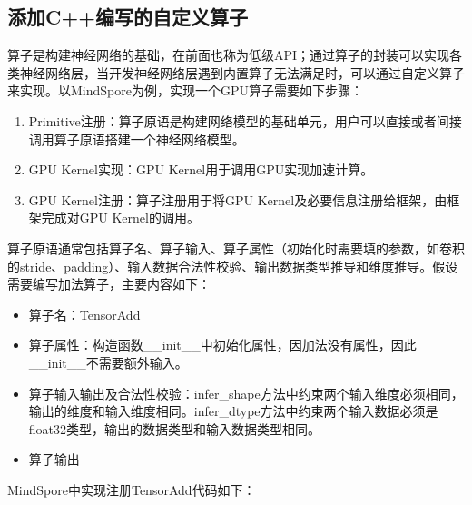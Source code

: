 \documentclass[letterpaper,10pt,english]{sphinxmanual}
\begin{document}
\subsection{添加C++编写的自定义算子}
\label{\detokenize{chapter_programming_interface/c_python_interaction:c}}
\sphinxAtStartPar
算子是构建神经网络的基础，在前面也称为低级API；通过算子的封装可以实现各类神经网络层，当开发神经网络层遇到内置算子无法满足时，可以通过自定义算子来实现。以MindSpore为例，实现一个GPU算子需要如下步骤：
\begin{enumerate}
%
\item {} 
\sphinxAtStartPar
Primitive注册：算子原语是构建网络模型的基础单元，用户可以直接或者间接调用算子原语搭建一个神经网络模型。

\item {} 
\sphinxAtStartPar
GPU Kernel实现：GPU Kernel用于调用GPU实现加速计算。

\item {} 
\sphinxAtStartPar
GPU Kernel注册：算子注册用于将GPU
Kernel及必要信息注册给框架，由框架完成对GPU Kernel的调用。

\end{enumerate}

\sphinxAtStartPar
{}
算子原语通常包括算子名、算子输入、算子属性（初始化时需要填的参数，如卷积的stride、padding）、输入数据合法性校验、输出数据类型推导和维度推导。假设需要编写加法算子，主要内容如下：
\begin{itemize}
\item {} 
\sphinxAtStartPar
算子名：TensorAdd

\item {} 
\sphinxAtStartPar
算子属性：构造函数\_\_init\_\_中初始化属性，因加法没有属性，因此\_\_init\_\_不需要额外输入。

\item {} 
\sphinxAtStartPar
算子输入输出及合法性校验：infer\_shape方法中约束两个输入维度必须相同，输出的维度和输入维度相同。infer\_dtype方法中约束两个输入数据必须是float32类型，输出的数据类型和输入数据类型相同。

\item {} 
\sphinxAtStartPar
算子输出

\end{itemize}

\sphinxAtStartPar
MindSpore中实现注册TensorAdd代码如下：
\end{document}
